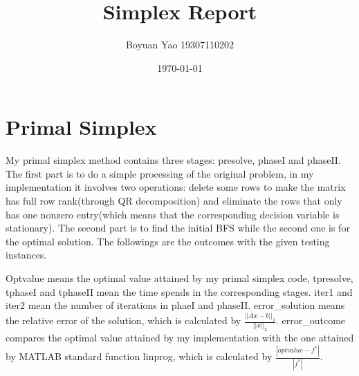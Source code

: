 \documentclass[11pt]{article}
\begin{document}
	
	\title{\bf Simplex Report}
	
	\author{Boyuan Yao 19307110202}
	
	
	\date{\today}
	\maketitle

	
\section{Primal Simplex}
	
	My primal simplex method contains three stages: presolve, phaseI and phaseII. The first part is to do a simple processing of the original problem, in my implementation it involves two operations: delete some rows to make the matrix has full row rank(through QR decomposition) and eliminate the rows that only has one nonzero entry(which means that the corresponding decision variable is stationary). The second part is to find the initial BFS while the second one is for the optimal solution. The followings are the outcomes with the given testing instances.
	\begin{center}
	\end{center}
	
	Optvalue means the optimal value attained by my primal simplex code, tpresolve, tphaseI and tphaseII mean the time spends in the corresponding stages. iter1 and iter2 mean the number of iterations in phaeI and phaseII. error\_solution means the relative error of the solution, which is calculated by $\frac{||Ax - b||_2}{||x||_2}$. error\_outcome compares the optimal value attained by my implementation with the one attained by MATLAB standard function linprog, which is calculated by $\frac{|optvalue - f^*|}{|f^*|}$.
	
\end{document}
